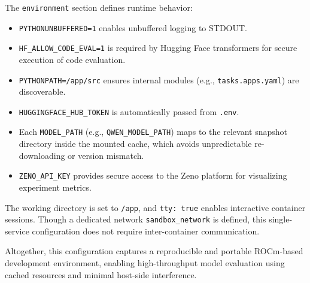 The \texttt{environment} section defines runtime behavior:
\begin{itemize}
	\item \texttt{PYTHONUNBUFFERED=1} enables unbuffered logging to STDOUT.
	\item \texttt{HF\_ALLOW\_CODE\_EVAL=1} is required by Hugging Face transformers for secure execution of code evaluation.
	\item \texttt{PYTHONPATH=/app/src} ensures internal modules (e.g., \texttt{tasks.apps.yaml}) are discoverable.
	\item \texttt{HUGGINGFACE\_HUB\_TOKEN} is automatically passed from \texttt{.env}.
	\item Each \texttt{MODEL\_PATH} (e.g., \texttt{QWEN\_MODEL\_PATH}) maps to the relevant snapshot directory inside the mounted cache, which avoids unpredictable re-downloading or version mismatch.
	\item \texttt{ZENO\_API\_KEY} provides secure access to the Zeno platform for visualizing experiment metrics.
\end{itemize}

The working directory is set to \texttt{/app}, and \texttt{tty: true} enables interactive container sessions. Though a dedicated network \texttt{sandbox\_network} is defined, this single-service configuration does not require inter-container communication.

Altogether, this configuration captures a reproducible and portable ROCm-based development environment, enabling high-throughput model evaluation using cached resources and minimal host-side interference.
